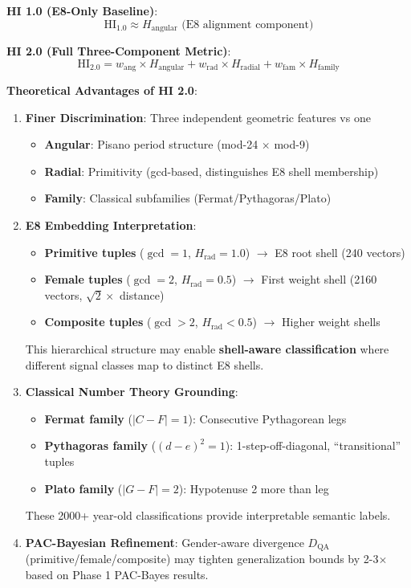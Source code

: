 \documentclass[11pt]{article}
\theoremstyle{remark}
\begin{document}
\textbf{HI 1.0 (E8-Only Baseline)}:
\begin{equation}
\text{HI}_{1.0} \approx H_{\text{angular}} \text{ (E8 alignment component)}
\end{equation}

\textbf{HI 2.0 (Full Three-Component Metric)}:
\begin{equation}
\text{HI}_{2.0} = w_{\text{ang}} \times H_{\text{angular}} + w_{\text{rad}} \times H_{\text{radial}} + w_{\text{fam}} \times H_{\text{family}}
\end{equation}

\textbf{Theoretical Advantages of HI 2.0}:

\begin{enumerate}
\item \textbf{Finer Discrimination}: Three independent geometric features vs one
\begin{itemize}
\item \textbf{Angular}: Pisano period structure (mod-24 $\times$ mod-9)
\item \textbf{Radial}: Primitivity (gcd-based, distinguishes E8 shell membership)
\item \textbf{Family}: Classical subfamilies (Fermat/Pythagoras/Plato)
\end{itemize}

\item \textbf{E8 Embedding Interpretation}:
\begin{itemize}
\item \textbf{Primitive tuples} ($\gcd=1$, $H_{\text{rad}}=1.0$) $\to$ E8 root shell (240 vectors)
\item \textbf{Female tuples} ($\gcd=2$, $H_{\text{rad}}=0.5$) $\to$ First weight shell (2160 vectors, $\sqrt{2}\times$ distance)
\item \textbf{Composite tuples} ($\gcd>2$, $H_{\text{rad}}<0.5$) $\to$ Higher weight shells
\end{itemize}

This hierarchical structure may enable \textbf{shell-aware classification} where different signal classes map to distinct E8 shells.

\item \textbf{Classical Number Theory Grounding}:
\begin{itemize}
\item \textbf{Fermat family} ($|C-F|=1$): Consecutive Pythagorean legs
\item \textbf{Pythagoras family} ($(d-e)^2=1$): 1-step-off-diagonal, ``transitional'' tuples
\item \textbf{Plato family} ($|G-F|=2$): Hypotenuse 2 more than leg
\end{itemize}

These 2000+ year-old classifications provide interpretable semantic labels.

\item \textbf{PAC-Bayesian Refinement}: Gender-aware divergence $D_{\text{QA}}$ (primitive/female/composite) may tighten generalization bounds by 2-3$\times$ based on Phase 1 PAC-Bayes results.
\end{enumerate}
\end{document}
